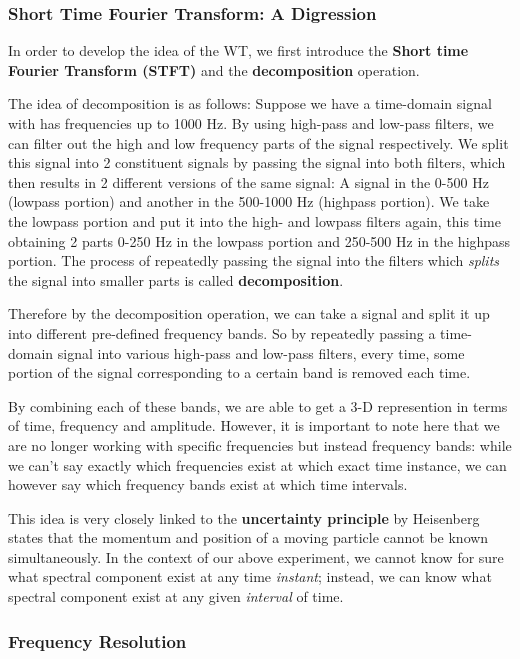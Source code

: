 \documentclass{article}
\begin{document}
		\subsubsection{Short Time Fourier Transform: A Digression}
		
		In order to develop the idea of the WT, we first introduce the \textbf{Short time Fourier Transform (STFT)} and the \textbf{decomposition} operation.
		
		The idea of decomposition is as follows: Suppose we have a time-domain signal with has frequencies up to 1000 Hz. By using high-pass and low-pass filters, we can filter out the high and low frequency parts of the signal respectively. We split this signal into 2 constituent signals by passing the signal into both filters, which then results in 2 different versions of the same signal: A signal in the 0-500 Hz (lowpass portion) and another in the 500-1000 Hz (highpass portion). We take the lowpass portion and put it into the high- and lowpass filters again, this time obtaining 2 parts 0-250 Hz in the lowpass portion and 250-500 Hz in the highpass portion. The process of repeatedly passing the signal into the filters which \textit{splits} the signal into smaller parts is called \textbf{decomposition}. 
		
		Therefore by the decomposition operation, we can take a signal and split it up into different pre-defined frequency bands. So by repeatedly passing a time-domain signal into various high-pass and low-pass filters, every time, some portion of the signal corresponding to a certain band is removed each time. 
		
		By combining each of these bands, we are able to get a 3-D represention in terms of time, frequency and amplitude. However, it is important to note here that we are no longer working with specific frequencies but instead frequency bands: while we can't say exactly which frequencies exist at which exact time instance, we can however say which frequency bands exist at which time intervals. 
		
		This idea is very closely linked to the \textbf{uncertainty principle} by Heisenberg states that the momentum and position of a moving particle cannot be known simultaneously. In the context of our above experiment, we cannot know for sure what spectral component exist at any time \textit{instant}; instead, we can know what spectral component exist at any given \textit{interval} of time.
		
		\subsubsection{Frequency Resolution}
		
\end{document}
